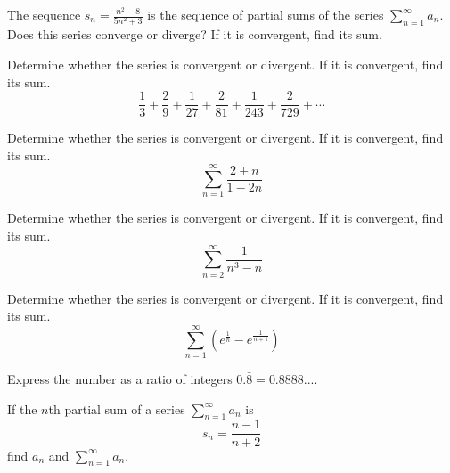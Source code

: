 \documentclass[
  course = {{MATH102 Calculus II}},
  quartile = {{2}},
  assignment = 19,%
  topic = {{11.2: Series}},
  firstexercise = 1,
  term = 202
]{aga-homework}
\begin{document}
\newpage

\problem The sequence $\displaystyle s_n=\frac{n^2-8}{5n^2+3}$ is the sequence of partial sums of the series $\displaystyle \sum_{n=1}^{\infty}a_n$. Does this series converge or diverge? If it is convergent, find its sum.
\newpage

\problem Determine whether the series is convergent or divergent. If it is convergent, find its sum.
\[
\frac{1}{3}+\frac{2}{9}+\frac{1}{27}+\frac{2}{81}+\frac{1}{243}+\frac{2}{729}+\cdots
\]
\newpage


\problem Determine whether the series is convergent or divergent. If it is convergent, find its sum.
\[
\sum_{n=1}^{\infty} \frac{2+n}{1-2n}
\]
\newpage



\problem Determine whether the series is convergent or divergent. If it is convergent, find its sum.
\[
\sum_{n=2}^{\infty} \frac{1}{n^3-n}
\]
\newpage


\problem Determine whether the series is convergent or divergent. If it is convergent, find its sum.
\[
\sum_{n=1}^{\infty} \left(e^{\frac{1}{n}}-e^{\frac{1}{n+1}}\right)
\]
\newpage

\problem Express the number as a ratio of integers $0.\bar{8}=0.8888...$.
\newpage

\problem If the $n$th partial sum of a series $\displaystyle \sum_{n=1}^{\infty}a_n$ is 
\[
s_n=\frac{n-1}{n+2}
\]
find $a_n$ and $\displaystyle \sum_{n=1}^{\infty}a_n$.
\newpage

\afterpage{\null\newpage}

\afterpage{\null\newpage}

\afterpage{\null\newpage}
\end{document}
